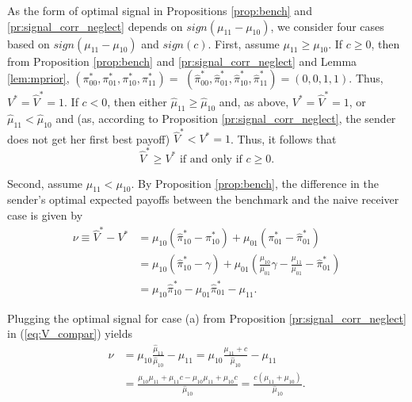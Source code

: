 \documentclass[12pt,english]{article}
\theoremstyle{plain}
\begin{document}
\begin{appendices}
As the form of optimal signal in Propositions \ref{prop:bench} and \ref{pr:signal_corr_neglect} depends on $sign(\mu_{11}- \mu_{10})$, we consider four cases based on $sign(\mu_{11}- \mu_{10})$ and $sign(c)$.
First, assume $\mu_{11}\geq\mu_{10}$. If $c\geq0$, then from Proposition \ref{prop:bench} and \ref{pr:signal_corr_neglect} and Lemma \ref{lem:mprior},  $(\pi_{00}^{*},\pi_{01}^{*},\pi_{10}^{*},\pi_{11}^{*})=$ $(\hat{\pi}_{00}^{*},\hat{\pi}_{01}^{*},\hat{\pi}_{10}^{*},\hat{\pi}_{11}^{*})=(0,0,1,1)$. 
Thus, $V^{*}=\hat{V}^{*}=1$. If $c<0$, then either $\hat{\mu}_{11}\geq\hat{\mu}_{10}$ and, as above, $V^{*}=\hat{V}^{*}=1$, or $\hat{\mu}_{11}<\hat{\mu}_{10}$ and (as, according to Proposition \ref{pr:signal_corr_neglect}, the sender does not get her first best payoff) $\hat{V}^{*}<V^{*}=1$. Thus, it follows that 
\begin{equation}
\hat{V}^{*}\geq V^{*} \text{ if and only if } c\geq0.
\label{eq:V_compar_result_1}
\end{equation}

Second, assume $\mu_{11}<\mu_{10}$.
By Proposition \ref{prop:bench}, the difference in the sender's optimal expected payoffs between
the benchmark and the naive receiver case is given by
\begin{equation}
\begin{aligned}\nu\equiv\hat{V}^{*}-V^{*} & =\mu_{10}\left(\hat{\pi}_{10}^{*}-\pi_{10}^{*}\right)+\mu_{01}\left(\pi_{01}^{*}-\hat{\pi}_{01}^{*}\right)\\
 & =\mu_{10}\left(\hat{\pi}_{10}^{*}-\gamma\right)+\mu_{01}\left(\frac{\mu_{10}}{\mu_{01}}\gamma-\frac{\mu_{11}}{\mu_{01}}-\hat{\pi}_{01}^{*}\right)\\
 & =\mu_{10}\hat{\pi}_{10}^{*}-\mu_{01}\hat{\pi}_{01}^{*}-\mu_{11}.
\end{aligned} \label{eq:V_compar}
\end{equation}

Plugging the optimal signal for case (a) from Proposition  \ref{pr:signal_corr_neglect} in (\ref{eq:V_compar}) yields
\begin{equation}
\begin{aligned}
\nu &=\mu_{10}\frac{\hat{\mu}_{11}}{\hat{\mu}_{10}}-\mu_{11}
=\mu_{10}\frac{\mu_{11}+c}{\hat{\mu}_{10}}-\mu_{11} \\&=\frac{\mu_{10}\mu_{11}+\mu_{11}c-\mu_{10}\mu_{11}+\mu_{10}c}{\hat{\mu}_{10}}=\frac{c\left(\mu_{11}+\mu_{10}\right)}{\hat{\mu}_{10}}.
\end{aligned} \label{eq:main_a}
\end{equation}



\end{appendices}
\end{document}
